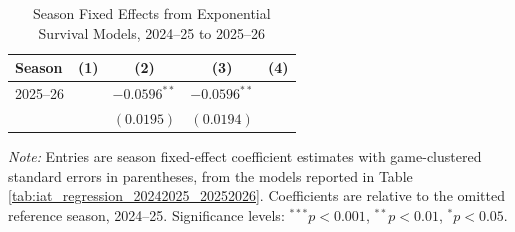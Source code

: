 \begin{table}[htbp]
\centering
\caption{Season Fixed Effects from Exponential Survival Models, 2024--25 to 2025--26}
\label{tab:season_control_results_20242025_20252026}
\scriptsize
\renewcommand{\arraystretch}{1.12}
\setlength{\tabcolsep}{6pt}

\begin{tabular*}{0.85\textwidth}{@{\extracolsep{\fill}}lcccc}
\toprule
Season & (1) & (2) & (3) & (4) \\
\midrule
2025--26 &  & $-0.0596^{**}$ & $-0.0596^{**}$ &  \\
 &  & $(0.0195)$ & $(0.0194)$ &  \\
\bottomrule
\end{tabular*}

\vspace{0.4em}
\parbox{0.85\textwidth}{
\footnotesize
\textit{Note:} Entries are season fixed-effect coefficient estimates with game-clustered standard errors in parentheses, from the models reported in Table \ref{tab:iat_regression_20242025_20252026}. Coefficients are relative to the omitted reference season, 2024--25. Significance levels: $^{***}p<0.001$, $^{**}p<0.01$, $^{*}p<0.05$.
}
\end{table}
